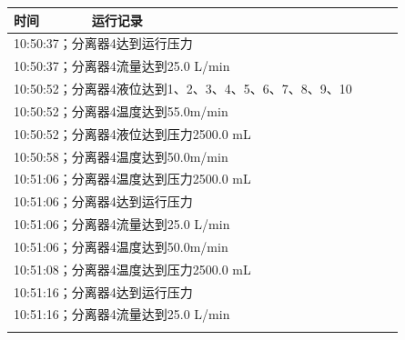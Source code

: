 \documentclass[UTF8,10pt,a4paper,fontset=fandol]{ctexart}
\newcommand{\fieldvalue}[1]{#1}
\begin{document}
\begin{center}
\begin{minipage}[t]{0.47\linewidth}
\scriptsize
\begin{tabular}{|p{0.18\linewidth}|p{0.72\linewidth}|}
\hline
时间 & 运行记录\\ \hline
\multicolumn{2}{|l|}{
\fieldvalue{10:50:37；分离器4达到运行压力}} \\ \hline
\multicolumn{2}{|l|}{
\fieldvalue{10:50:37；分离器4流量达到25.0 L/min}} \\ \hline
\multicolumn{2}{|l|}{
\fieldvalue{10:50:52；分离器4液位达到1、2、3、4、5、6、7、8、9、10}} \\ \hline
\multicolumn{2}{|l|}{
\fieldvalue{10:50:52；分离器4温度达到55.0m/min}} \\ \hline
\multicolumn{2}{|l|}{
\fieldvalue{10:50:52；分离器4液位达到压力2500.0 mL}} \\ \hline
\multicolumn{2}{|l|}{
\fieldvalue{10:50:58；分离器4温度达到50.0m/min}} \\ \hline
\multicolumn{2}{|l|}{
\fieldvalue{10:51:06；分离器4温度达到压力2500.0 mL}} \\ \hline
\multicolumn{2}{|l|}{
\fieldvalue{10:51:06；分离器4达到运行压力}} \\ \hline
\multicolumn{2}{|l|}{
\fieldvalue{10:51:06；分离器4流量达到25.0 L/min}} \\ \hline
\multicolumn{2}{|l|}{
\fieldvalue{10:51:06；分离器4温度达到50.0m/min}} \\ \hline
\multicolumn{2}{|l|}{
\fieldvalue{10:51:08；分离器4温度达到压力2500.0 mL}} \\ \hline
\multicolumn{2}{|l|}{
\fieldvalue{10:51:16；分离器4达到运行压力}} \\ \hline
\multicolumn{2}{|l|}{
\fieldvalue{10:51:16；分离器4流量达到25.0 L/min}} \\ \hline
\multicolumn{2}{|l|}{
}
\end{tabular}
\end{minipage}
\end{center}
\end{document}
